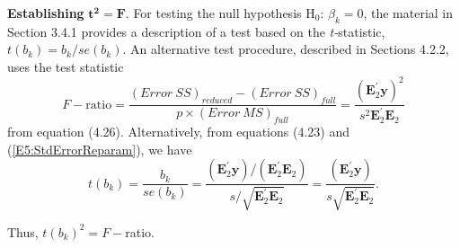 \textbf{Establishing }$\mathbf{t}^{\mathbf{2}}\mathbf{=F}$. For
testing the null hypothesis H$_0$: $\beta_{k}=0$, the material in
Section 3.4.1 provides a description of a test based on the
\textit{t-}statistic, $t(b_{k})=b_{k}/se(b_{k})$. An alternative
test procedure, described in Sections 4.2.2, uses the test statistic
\begin{equation*}
F-\text{ratio} = \frac{(Error~SS)_{reduced}-(Error~SS)_{full}} {p
\times (Error~MS)_{full}} = \frac{\left(
\mathbf{E}_2^{\prime}\mathbf{y}\right) ^2}{s^2\mathbf{E}_2^{\prime}
\mathbf{E}_2}
\end{equation*}
from equation (4.26). Alternatively, from equations (4.23) and
(\ref{E5:StdErrorReparam}), we have
\begin{equation}\label{E5:tStat}
t(b_{k})=\frac{b_{k}}{se(b_{k})}=\frac{\left( \mathbf{E}_2^{\prime}
\mathbf{y}\right) /\left( \mathbf{E}_2^{\prime}\mathbf{E}_2\right)}
{s/\sqrt{\mathbf{E}_2^{\prime}\mathbf{E}_2}}= \frac{\left(
\mathbf{E}_2^{\prime}\mathbf{y}\right) }{s\sqrt{
\mathbf{E}_2^{\prime}\mathbf{E}_2}}.
\end{equation}

\noindent Thus, $t(b_{k})^2=F-$ratio.


